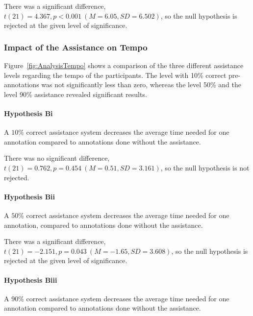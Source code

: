 		There was a significant difference, \(t(21) = 4.367, p < 0.001\ (M = 6.05, SD = 6.502)\), so the null hypothesis is rejected at the given level of significance.



	\subsubsection{Impact of the Assistance on Tempo}
		Figure~\ref{fig:AnalysisTempo} shows a comparison of the three different assistance levels regarding the tempo of the participants. The level with 10\% correct pre-annotations was not significantly less than zero, whereas the level 50\% and the level 90\% assistance revealed significant results.


		\paragraph{Hypothesis Bi}
		\lqq A \(10\%\) correct assistance system decreases the average time needed for one annotation compared to annotations done without the assistance.\rqq

		There was no significant difference, \(t(21) = 0.762, p = 0.454\ (M = 0.51, SD = 3.161)\), so the null hypothesis is not rejected.

		\paragraph{Hypothesis Bii}
		\lqq A \(50\%\) correct assistance system decreases the average time needed for one annotation, compared to annotations done without the assistance.\rqq

		There was a significant difference, \(t(21) = -2.151, p = 0.043\ (M = -1.65, SD = 3.608)\), so the null hypothesis is rejected at the given level of significance.

		\paragraph{Hypothesis Biii}
		\lqq A \(90\%\) correct assistance system decreases the average time needed for one annotation compared to annotations done without the assistance.\rqq

